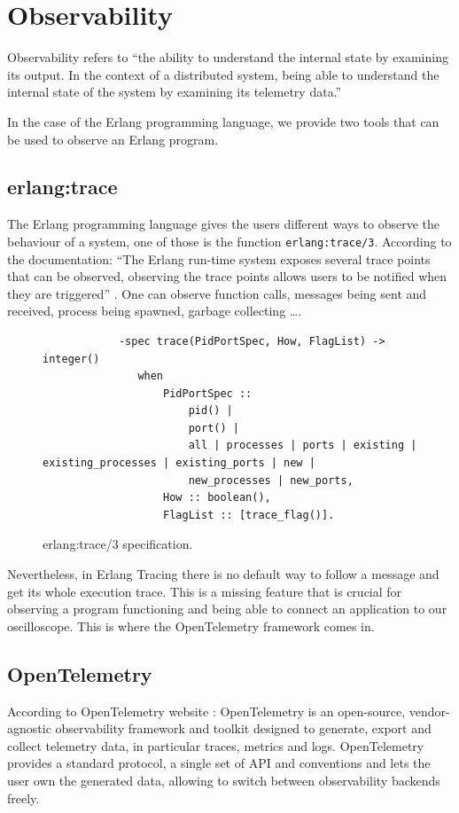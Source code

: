 \section{Observability}
        Observability refers to ``the ability to understand the internal state by examining its output. In the context of a distributed system, being able to understand the internal state of the system by examining its telemetry data.'' \cite{otel-o}

    In the case of the Erlang programming language, we provide two tools that can be used to observe an Erlang program.
    
    \subsection{erlang:trace}
        The Erlang programming language gives the users different ways to observe the behaviour of a system, one of those is the function \texttt{erlang:trace/3}. According to the documentation: ``The Erlang run-time system exposes several trace points that can be observed, observing the trace points allows users to be notified when they are triggered'' \cite{erl-t}. One can observe function calls, messages being sent and received, process being spawned, garbage collecting \dots. 
        \begin{figure}[!ht]
        \centering
        \begin{verbatim}
            -spec trace(PidPortSpec, How, FlagList) -> integer()
               when
                   PidPortSpec ::
                       pid() |
                       port() |
                       all | processes | ports | existing | existing_processes | existing_ports | new |
                       new_processes | new_ports,
                   How :: boolean(),
                   FlagList :: [trace_flag()].
        \end{verbatim}
        \caption{erlang:trace/3 specification.}
\end{figure}

    Nevertheless, in Erlang Tracing there is no default way to follow a message and get its whole execution trace. This is a missing feature that is crucial for observing a program functioning and being able to connect an application to our oscilloscope.  This is where the OpenTelemetry framework comes in.

\subsection{OpenTelemetry}
    According to OpenTelemetry website \cite{otel-o}: OpenTelemetry is an open-source, vendor-agnostic observability framework and toolkit designed to generate, export and collect telemetry data, in particular traces, metrics and logs. OpenTelemetry provides a standard protocol, a single set of API and conventions and lets the user own the generated data, allowing to switch between observability backends freely.
   
